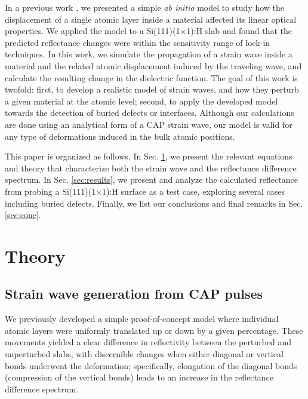 \documentclass[aps,prb,10pt,showkeys,letterpaper,notitlepage,twocolumn]{revtex4-1}
\begin{document}
In a previous work \cite{andersonPSSB18}, we presented a simple \emph{ab initio}
model to study how the displacement of a single atomic layer inside a material
affected its linear optical properties. We applied the model to a
Si(111)(1$\times$1):H slab and found that the predicted reflectance changes were
within the sensitivity range of lock-in techniques. In this work, we simulate
the propagation of a strain wave inside a material and the related atomic
displacement induced by the traveling wave, and calculate the resulting change
in the dielectric function. The goal of this work is twofold: first, to develop
a realistic model of strain waves, and how they perturb a given material at the
atomic level; second, to apply the developed model towards the detection of
buried defects or interfaces. Although our calculations are done using an
analytical form of a CAP strain wave, our model is valid for any type of
deformations induced in the bulk atomic positions.

This paper is organized as follows. In Sec. \ref{sec:theory}, we present the
relevant equations and theory that characterize both the strain wave and the
reflectance difference spectrum. In Sec. \ref{sec:results}, we present and
analyze the calculated reflectance from probing a Si(111)(1$\times$1):H surface
as a test case, exploring several cases including buried defects. Finally, we
list our conclusions and final remarks in Sec. \ref{sec:conc}.


\section{Theory}\label{sec:theory}


\subsection{Strain wave generation from CAP pulses}

We previously developed a simple proof-of-concept model \cite{andersonPSSB18}
where individual atomic layers were uniformly translated up or down by a given
percentage. These movements yielded a clear difference in reflectivity between
the perturbed and unperturbed slabs, with discernible changes when either
diagonal or vertical bonds underwent the deformation; specifically, elongation
of the diagonal bonds (compression of the vertical bonds) leads to an increase
in the reflectance difference spectrum.
\end{document}
